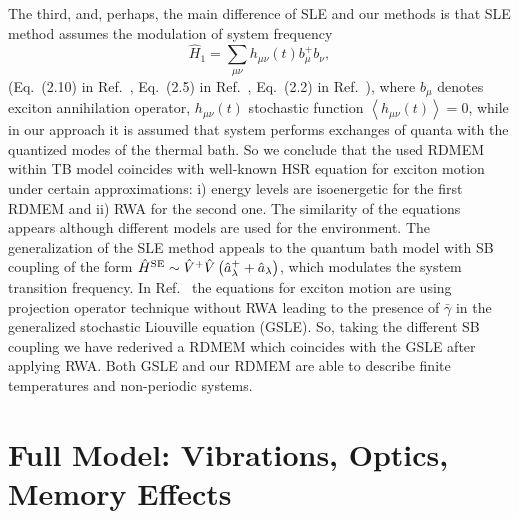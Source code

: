 \documentclass[12pt,twoside,a4paper]{report}
\begin{document}
{The third, and, perhaps, the main difference of SLE and our
methods is that SLE method assumes the modulation of system frequency
\begin{equation}
\hat H_1 = \sum\limits_{\mu \nu} h_{\mu \nu}(t)b_{\mu}^+b_{\nu},
\label{H_SLE}
\end{equation}
(Eq.~(2.10) in Ref.~\cite{rein82}, Eq.~(2.5) in Ref.~\cite{hake72},
Eq.~(2.2) in Ref.~\cite{rein79}),
where $b_{\mu}$ denotes exciton annihilation operator, 
$h_{\mu \nu}(t)$ stochastic function $\left< h_{\mu \nu}(t) \right> = 0$,
while in our approach it is assumed
that system performs exchanges of quanta with the 
quantized modes of the 
thermal bath.  So we
conclude that the 
used RDMEM
within TB model 
coincides with
well-known HSR
equation for exciton motion under certain approximations:
i) energy levels are isoenergetic for the first RDMEM
and ii) RWA for the second one.
The similarity of the equations appears although different models 
are used for the environment.
The generalization \cite{cape94}
of the SLE method 
appeals to the quantum bath model with SB coupling of the form
$\hat H^{\rm SE} 
                  \sim 
                         \hat V^+ 
                         \hat V 
                            \left( 
                                \hat a^+_\lambda  
                              + \hat a_\lambda 
                            \right)$,  
which modulates the system transition frequency.
In Ref.~\cite{cape94} the 
equations for exciton motion 
are using projection operator technique
without
RWA leading to the
presence of $\bar \gamma$
in the generalized stochastic Liouville equation (GSLE).
So, taking the different SB coupling we have rederived a RDMEM
which coincides with the GSLE \cite{cape94} after applying RWA.
Both GSLE and our RDMEM are able to describe finite 
temperatures and non-periodic systems.
\chapter*{}
% 
\chapter{Full Model: Vibrations, Optics, Memory Effects} \label{optics}
 
}
\end{document}
